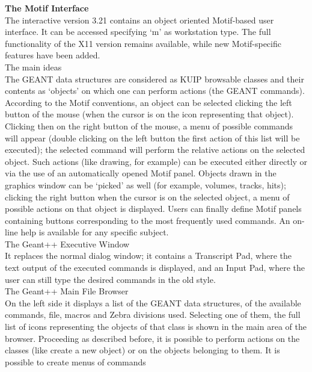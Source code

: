 \oddsidemargin 0.54cm
\evensidemargin 0.0cm
\topmargin -50pt
\textheight 22.5cm 


\pagestyle{plain}
\rm
\Large
{\bf The Motif Interface}
\\[2em]
\large
\rm
The interactive version 3.21 contains an object oriented Motif-based user
interface. It can be accessed specifying `m' as workstation type.
The full functionality of the X11 version remains available, while new 
Motif-specific features have been added. \\[1em]
The main ideas \\[1em]
The GEANT data structures are considered as KUIP browsable classes and their
contents as `objects' on which one can perform actions (the GEANT commands).
According to the Motif conventions, an object can be selected clicking the
left button of the mouse (when the cursor is on the icon representing that
object). Clicking then on the right button of the mouse, a menu of possible
commands will appear (double clicking on the left button the first action of
this list will be executed); 
the selected command will perform the relative actions
on the selected object. Such actions (like drawing, for example) can be
executed either directly or via the use of an automatically opened Motif panel.
Objects drawn in the graphics window can be `picked' as well (for example,
volumes, tracks, hits); clicking the right button when the cursor is on the
selected object, a menu of possible actions on that object is displayed.
Users can finally define Motif panels containing buttons corresponding to the
most frequently used commands. An on-line help is available for any specific
subject. \\[1em]
The Geant++ Executive Window \\[1em]
It replaces the normal dialog window; it contains a Transcript Pad, where the
text output of the executed commands is displayed, and an Input Pad, where the
user can still type the desired commands in the old style. \\[1em]
The Geant++ Main File Browser \\[1em]
On the left side it displays a list of the GEANT data structures, of the 
available commands, file, macros and Zebra divisions used. Selecting one of
them, the full list of icons representing the objects of that class is shown
in the main area of the browser. Proceeding as described before, it is 
possible to perform actions on the classes (like create a new object) or on
the objects belonging to them. It is possible to create menus of commands
